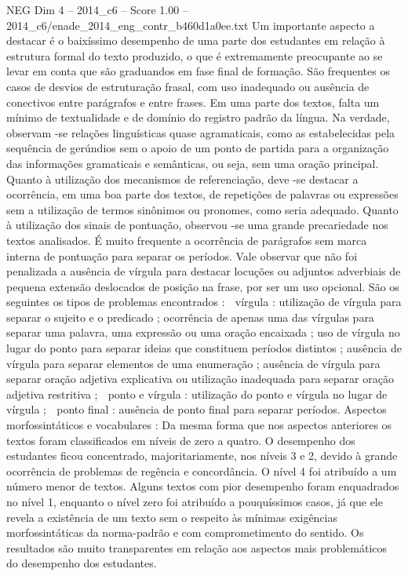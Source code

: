 \begin{textsample}{NEG Dim 4 – 2014\_c6 – Score 1.00 – 2014\_c6/enade\_2014\_eng\_contr\_b460d1a0ee.txt}
Um importante aspecto a destacar é o baixíssimo desempenho de uma parte dos estudantes em relação à estrutura formal do texto produzido, o que é extremamente preocupante ao se levar em conta que são graduandos em fase final de formação.
São frequentes os casos de desvios de estruturação frasal, com uso inadequado ou ausência de conectivos entre parágrafos e entre frases.
Em uma parte dos textos, falta um mínimo de textualidade e de domínio do registro padrão da língua.
Na verdade, observam -se relações linguísticas quase agramaticais, como as estabelecidas pela sequência de gerúndios sem o apoio de um ponto de partida para a organização das informações gramaticais e semânticas, ou seja, sem uma oração principal.
Quanto à utilização dos mecanismos de referenciação, deve -se destacar a ocorrência, em uma boa parte dos textos, de repetições de palavras ou expressões sem a utilização de termos sinônimos ou pronomes, como seria adequado.
Quanto à utilização dos sinais de pontuação, observou -se uma grande precariedade nos textos analisados.
É muito frequente a ocorrência de parágrafos sem marca interna de pontuação para separar os períodos.
Vale observar que não foi penalizada a ausência de vírgula para destacar locuções ou adjuntos adverbiais de pequena extensão deslocados de posição na frase, por ser um uso opcional.
São os seguintes os tipos de problemas encontrados :  vírgula : utilização de vírgula para separar o sujeito e o predicado ; ocorrência de apenas uma das vírgulas para separar uma palavra, uma expressão ou uma oração encaixada ; uso de vírgula no lugar do ponto para separar ideias que constituem períodos distintos ; ausência de vírgula para separar elementos de uma enumeração ; ausência de vírgula para separar oração adjetiva explicativa ou utilização inadequada para separar oração adjetiva restritiva ;  ponto e vírgula : utilização do ponto e vírgula no lugar de vírgula ;  ponto final : ausência de ponto final para separar períodos.
Aspectos morfossintáticos e vocabulares : Da mesma forma que nos aspectos anteriores os textos foram classificados em níveis de zero a quatro.
O desempenho dos estudantes ficou concentrado, majoritariamente, nos níveis 3 e 2, devido à grande ocorrência de problemas de regência e concordância.
O nível 4 foi atribuído a um número menor de textos.
Alguns textos com pior desempenho foram enquadrados no nível 1, enquanto o nível zero foi atribuído a pouquíssimos casos, já que ele revela a existência de um texto sem o respeito às mínimas exigências morfossintáticas da norma-padrão e com comprometimento do sentido.
Os resultados são muito transparentes em relação aos aspectos mais problemáticos do desempenho dos estudantes.

\end{textsample}

